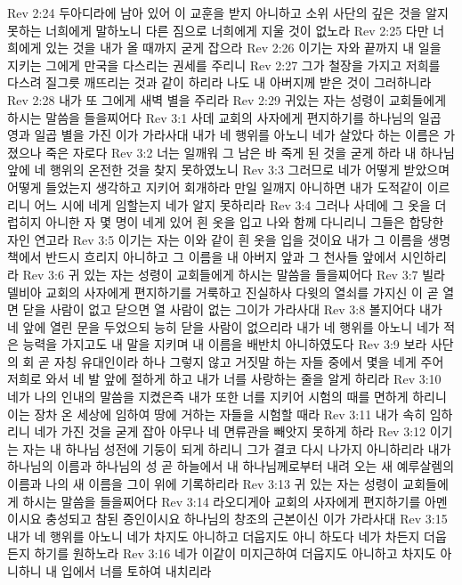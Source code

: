Rev 2:24  두아디라에 남아 있어 이 교훈을 받지 아니하고 소위 사단의 깊은 것을 알지 못하는 너희에게 말하노니 다른 짐으로 너희에게 지울 것이 없노라
Rev 2:25  다만 너희에게 있는 것을 내가 올 때까지 굳게 잡으라
Rev 2:26  이기는 자와 끝까지 내 일을 지키는 그에게 만국을 다스리는 권세를 주리니
Rev 2:27  그가 철장을 가지고 저희를 다스려 질그릇 깨뜨리는 것과 같이 하리라 나도 내 아버지께 받은 것이 그러하니라
Rev 2:28  내가 또 그에게 새벽 별을 주리라
Rev 2:29  귀있는 자는 성령이 교회들에게 하시는 말씀을 들을찌어다
Rev 3:1  사데 교회의 사자에게 편지하기를 하나님의 일곱 영과 일곱 별을 가진 이가 가라사대 내가 네 행위를 아노니 네가 살았다 하는 이름은 가졌으나 죽은 자로다
Rev 3:2  너는 일깨워 그 남은 바 죽게 된 것을 굳게 하라 내 하나님 앞에 네 행위의 온전한 것을 찾지 못하였노니
Rev 3:3  그러므로 네가 어떻게 받았으며 어떻게 들었는지 생각하고 지키어 회개하라 만일 일깨지 아니하면 내가 도적같이 이르리니 어느 시에 네게 임할는지 네가 알지 못하리라
Rev 3:4  그러나 사데에 그 옷을 더럽히지 아니한 자 몇 명이 네게 있어 흰 옷을 입고 나와 함께 다니리니 그들은 합당한 자인 연고라
Rev 3:5  이기는 자는 이와 같이 흰 옷을 입을 것이요 내가 그 이름을 생명책에서 반드시 흐리지 아니하고 그 이름을 내 아버지 앞과 그 천사들 앞에서 시인하리라
Rev 3:6  귀 있는 자는 성령이 교회들에게 하시는 말씀을 들을찌어다
Rev 3:7  빌라델비아 교회의 사자에게 편지하기를 거룩하고 진실하사 다윗의 열쇠를 가지신 이 곧 열면 닫을 사람이 없고 닫으면 열 사람이 없는 그이가 가라사대
Rev 3:8  볼지어다 내가 네 앞에 열린 문을 두었으되 능히 닫을 사람이 없으리라 내가 네 행위를 아노니 네가 적은 능력을 가지고도 내 말을 지키며 내 이름을 배반치 아니하였도다
Rev 3:9  보라 사단의 회 곧 자칭 유대인이라 하나 그렇지 않고 거짓말 하는 자들 중에서 몇을 네게 주어 저희로 와서 네 발 앞에 절하게 하고 내가 너를 사랑하는 줄을 알게 하리라
Rev 3:10  네가 나의 인내의 말씀을 지켰은즉 내가 또한 너를 지키어 시험의 때를 면하게 하리니 이는 장차 온 세상에 임하여 땅에 거하는 자들을 시험할 때라
Rev 3:11  내가 속히 임하리니 네가 가진 것을 굳게 잡아 아무나 네 면류관을 빼앗지 못하게 하라
Rev 3:12  이기는 자는 내 하나님 성전에 기둥이 되게 하리니 그가 결코 다시 나가지 아니하리라 내가 하나님의 이름과 하나님의 성 곧 하늘에서 내 하나님께로부터 내려 오는 새 예루살렘의 이름과 나의 새 이름을 그이 위에 기록하리라
Rev 3:13  귀 있는 자는 성령이 교회들에게 하시는 말씀을 들을찌어다
Rev 3:14  라오디게아 교회의 사자에게 편지하기를 아멘이시요 충성되고 참된 증인이시요 하나님의 창조의 근본이신 이가 가라사대
Rev 3:15  내가 네 행위를 아노니 네가 차지도 아니하고 더웁지도 아니 하도다 네가 차든지 더웁든지 하기를 원하노라
Rev 3:16  네가 이같이 미지근하여 더웁지도 아니하고 차지도 아니하니 내 입에서 너를 토하여 내치리라
